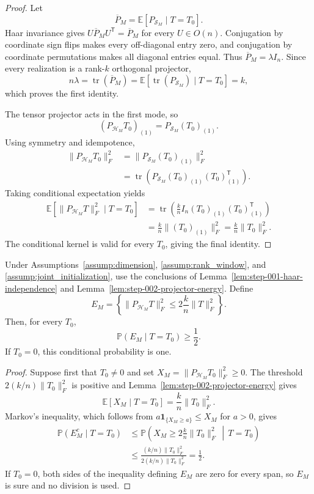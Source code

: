 \begin{proof}
Let
\[
 \overline P_M=\mathbb E[P_{\mathcal S_M}\mid T=T_0].
\]
Haar invariance gives
$U\overline P_MU^{\mathsf T}=\overline P_M$ for every $U\in O(n)$.
Conjugation by coordinate sign flips makes every off-diagonal entry zero, and
conjugation by coordinate permutations makes all diagonal entries equal.
Thus $\overline P_M=\lambda I_n$.  Since every realization is a rank-$k$
orthogonal projector,
\[
 n\lambda=\operatorname{tr}(\overline P_M)
 =\mathbb E[\operatorname{tr}(P_{\mathcal S_M})\mid T=T_0]=k,
\]
which proves the first identity.

The tensor projector acts in the first mode, so
\[
 (P_{\mathcal H_M}T_0)_{(1)}=P_{\mathcal S_M}(T_0)_{(1)}.
\]
Using symmetry and idempotence,
\[
 \begin{aligned}
 \|P_{\mathcal H_M}T_0\|_F^2
 &=\|P_{\mathcal S_M}(T_0)_{(1)}\|_F^2\\
 &=\operatorname{tr}\!\left(
 P_{\mathcal S_M}(T_0)_{(1)}(T_0)_{(1)}^{\mathsf T}\right).
 \end{aligned}
\]
Taking conditional expectation yields
\[
 \begin{aligned}
 \mathbb E[\|P_{\mathcal H_M}T\|_F^2\mid T=T_0]
 &=\operatorname{tr}\!\left(
 \frac{k}{n}I_n(T_0)_{(1)}(T_0)_{(1)}^{\mathsf T}\right)\\
 &=\frac{k}{n}\|(T_0)_{(1)}\|_F^2
 =\frac{k}{n}\|T_0\|_F^2.
 \end{aligned}
\]
The conditional kernel is valid for every $T_0$, giving the final identity.
\end{proof}

\begin{lemma}\label{lem:step-002-markov-event}
Under Assumptions~\ref{assump:dimension}, \ref{assump:rank_window}, and
\ref{assump:joint_initialization}, use the conclusions of
Lemma~\ref{lem:step-001-haar-independence} and
Lemma~\ref{lem:step-002-projector-energy}.  Define
\[
 E_M=\left\{
 \|P_{\mathcal H_M}T\|_F^2
 \le2\frac{k}{n}\|T\|_F^2
 \right\}.
\]
Then, for every $T_0$,
\[
 \mathbb P(E_M\mid T=T_0)\ge\frac12.
\]
If $T_0=0$, this conditional probability is one.
\end{lemma}

\begin{proof}
Suppose first that $T_0\ne0$ and set
$X_M=\|P_{\mathcal H_M}T_0\|_F^2\ge0$.  The threshold
$2(k/n)\|T_0\|_F^2$ is positive and
Lemma~\ref{lem:step-002-projector-energy} gives
\[
 \mathbb E[X_M\mid T=T_0]=\frac{k}{n}\|T_0\|_F^2.
\]
Markov's inequality, which follows from
$a\mathbf 1_{\{X_M\ge a\}}\le X_M$ for $a>0$, gives
\[
 \begin{aligned}
 \mathbb P(E_M^c\mid T=T_0)
 &\le\mathbb P\!\left(
 X_M\ge2\frac{k}{n}\|T_0\|_F^2\,\middle|\,T=T_0\right)\\
 &\le\frac{(k/n)\|T_0\|_F^2}
 {2(k/n)\|T_0\|_F^2}=\frac12.
 \end{aligned}
\]
If $T_0=0$, both sides of the inequality defining $E_M$ are zero for every
span, so $E_M$ is sure and no division is used.
\end{proof}

